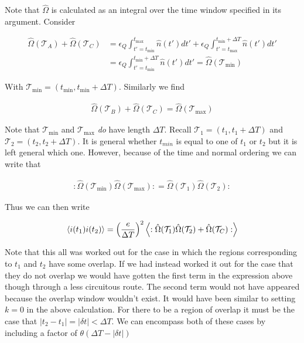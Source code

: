 \documentclass[12pt]{article}
\newcommand{\ep}{\epsilon}
\newcommand{\mc}[1]{\mathcal{#1}}
\begin{document}
Note that $\hat{\Omega}$ is calculated as an integral over the time window specified in its argument. Consider 

\begin{align}
\hat{\Omega}(\mc{T}_A) + \hat{\Omega}(\mc{T}_C) &= \ep_Q\int_{t'=t_{\text{min}}}^{t_{\text{max}}}\hat{n}(t') dt' + \ep_Q\int_{t'=t_{\text{max}}}^{t_{\text{min}}+\Delta T}\hat{n}(t') dt'\\
&=\ep_Q\int_{t'=t_{\text{min}}}^{t_{\text{min}}+\Delta T}\hat{n}(t') dt' = \hat{\Omega}(\mc{T}_{\text{min}})
\end{align}

With $\mc{T}_{\text{min}} = (t_{\text{min}}, t_{\text{min}}+\Delta T)$.
Similarly we find

\begin{align}
\hat{\Omega}(\mc{T}_B) + \hat{\Omega}(\mc{T}_C) = \hat{\Omega}(\mc{T}_{\text{max}})
\end{align}

Note that $\mc{T}_{\text{min}}$ and $\mc{T}_{\text{max}}$ \textit{do} have length $\Delta T$.
Recall $\mc{T}_1 = (t_1, t_1+\Delta T)$ and $\mc{T}_2 = (t_2, t_2+\Delta T)$. It is general whether $t_{min}$ is equal to one of $t_1$ or $t_2$ but it is left general which one. However, because of the time and normal ordering we can write that

\begin{align}
:\hat{\Omega}(\mc{T}_{\text{min}})\hat{\Omega}(\mc{T}_{\text{max}}): = \hat{\Omega}(\mc{T}_1)\hat{\Omega}(\mc{T}_2):
\end{align}

Thus we can then write

\begin{align}
\Braket{i(t_1)i(t_2)} = \left(\frac{e}{\Delta T}\right)^2 \Braket{:\hat{\Omega}(\mc{T}_1)\hat{\Omega}(\mc{T}_2) + \hat{\Omega}(\mc{T}_C) :}
\end{align}

Note that this all was worked out for the case in which the regions corresponding to $t_1$ and $t_2$ have some overlap. If we had instead worked it out for the case that they do not overlap we would have gotten the first term in the expression above though through a less circuitous route. The second term would not have appeared because the overlap window wouldn't exist. It would have been similar to setting $k=0$ in the above calculation. For there to be a region of overlap it must be the case that $|t_2-t_1|=|\delta t|<\Delta T$. We can encompass both of these cases by including a factor of $\theta(\Delta T-\lvert\delta t \rvert)$
\end{document}
